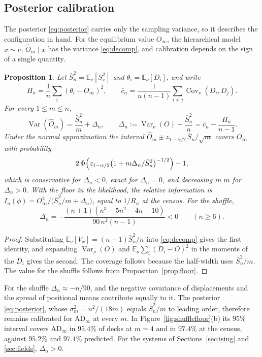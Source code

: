 \documentclass[ba,preprint]{imsart}
\theoremstyle{plain}
\newtheorem{proposition}[theorem]{Proposition}
\theoremstyle{definition}
\newcommand{\E}{\mathbb{E}}
\newcommand{\Var}{\operatorname{Var}}
\newcommand{\Cov}{\operatorname{Cov}}
\newcommand{\AD}{\mathrm{AD}}
\newcommand{\Oh}{\widehat{O}}
\begin{document}
\subsection{Posterior calibration}

The posterior \eqref{eq:posterior} carries only the sampling variance, so it describes the configuration in hand. For the equilibrium value $O_\infty$, the hierarchical model $x\sim\nu$, $\Oh_m\mid x$ has the variance \eqref{eq:decomp}, and calibration depends on the sign of a single quantity.

\begin{proposition}\label{prop:calib}
Let $\bar S_n^2=\E_\nu[S_x^2]$ and $\theta_i=\E_\nu[D_i]$, and write
\[
H_n=\frac1n\sum_i(\theta_i-O_\infty)^2,\qquad\bar c_n=\frac{1}{n(n-1)}\sum_{i\ne j}\Cov_\nu(D_i,D_j).
\]
For every $1\le m\le n$,
\begin{equation}\label{eq:Sbar}
\Var(\Oh_m)=\frac{\bar S_n^2}{m}+\Delta_n,\qquad\Delta_n:=\Var_\nu(O)-\frac{\bar S_n^2}{n}=\bar c_n-\frac{H_n}{n-1}.
\end{equation}
Under the normal approximation the interval $\Oh_m\pm z_{1-\alpha/2}\,\bar S_n/\sqrt m$ covers $O_\infty$ with probability
\begin{equation}\label{eq:coverage}
2\,\Phi\Bigl(z_{1-\alpha/2}\bigl(1+m\Delta_n/\bar S_n^2\bigr)^{-1/2}\Bigr)-1,
\end{equation}
which is conservative for $\Delta_n<0$, exact for $\Delta_n=0$, and decreasing in $m$ for $\Delta_n>0$. With the floor in the likelihood, the relative information is $I_n(\phi)=O_\infty^2/\bigl(\bar S_n^2/m+\Delta_n\bigr)$, equal to $1/R_n$ at the census. For the shuffle,
\begin{equation}\label{eq:Delta}
\Delta_n=-\frac{(n+1)(n^3-5n^2-4n-10)}{90\,n^2(n-1)}<0\qquad(n\ge6).
\end{equation}
\end{proposition}

\begin{proof}
Substituting $\E_\nu[V_x]=(n-1)\bar S_n^2/n$ into \eqref{eq:decomp} gives the first identity, and expanding $\Var_\nu(O)$ and $\E_\nu\sum_i(D_i-O)^2$ in the moments of the $D_i$ gives the second. The coverage follows because the half-width uses $\bar S_n^2/m$. The value for the shuffle follows from Proposition~\ref{prop:floor}.
\end{proof}

For the shuffle $\Delta_n\approx-n/90$, and the negative covariance of displacements and the spread of positional means contribute equally to it. The posterior \eqref{eq:posterior}, whose $\sigma_m^2=n^2/(18m)$ equals $\bar S_n^2/m$ to leading order, therefore remains calibrated for $\AD_\infty$ at every $m$. In Figure~\ref{fig:shufflefloor}(b) its 95\% interval covers $\AD_\infty$ in $95.4\%$ of decks at $m=4$ and in $97.4\%$ at the census, against $95.2\%$ and $97.1\%$ predicted. For the systems of Sections~\ref{sec:ising} and \ref{sec:fields}, $\Delta_n>0$.
\end{document}
